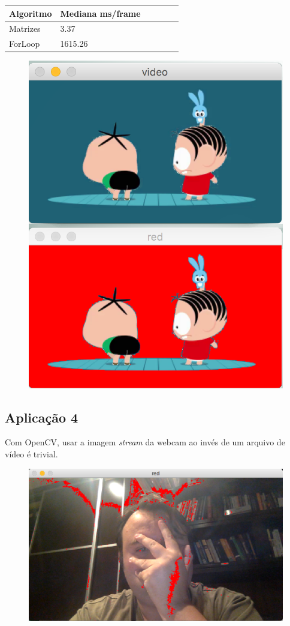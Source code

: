 \documentclass[conference]{IEEEtran}
\begin{document}
\begin{minipage}{\linewidth}
\centering
\begin{tabular}{ C{.755in} C{.85in} *4{C{.75in}}}\toprule[1.5pt]
\bf Algoritmo & \bf Mediana ms/frame  \bf \\\midrule
Matrizes        &  3.37 \\
ForLoop        &  1615.26 \\
\bottomrule[1.25pt]
\end {tabular}\par

\end{minipage}

\begin{figure}[ht!]
\begin{center}
\includegraphics[width=0.66\columnwidth]{toy.png}
\end{center}
\end{figure}


\subsection*{Aplicação 4}
Com OpenCV, usar a imagem \textit{stream} da webcam ao invés de um arquivo de vídeo é trivial.
\begin{figure}[ht!]
\begin{center}
\includegraphics[width=0.66\columnwidth]{cam.png}
\end{center}
\end{figure}
\end{document}
